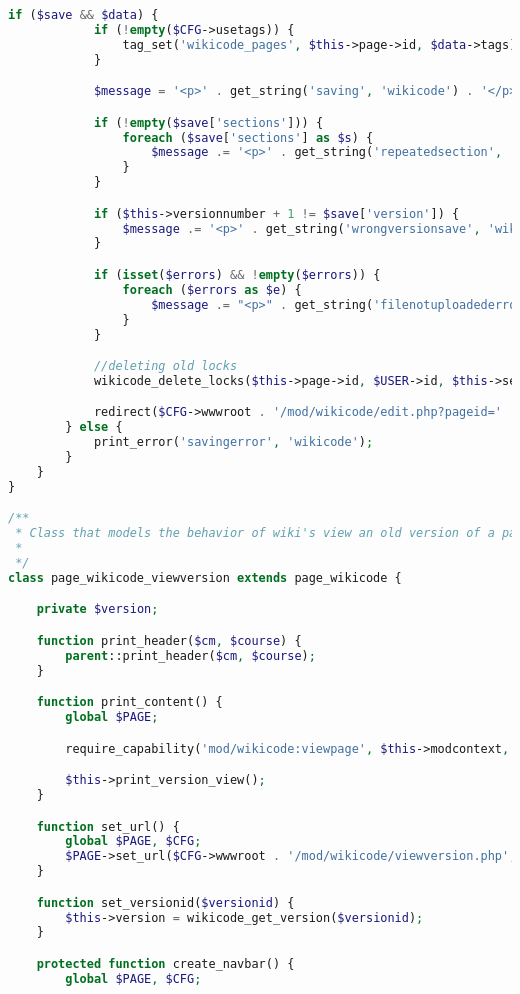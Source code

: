 \begin{lstlisting}[language=PHP]
        if ($save && $data) {
            if (!empty($CFG->usetags)) {
                tag_set('wikicode_pages', $this->page->id, $data->tags);
            }

            $message = '<p>' . get_string('saving', 'wikicode') . '</p>';

            if (!empty($save['sections'])) {
                foreach ($save['sections'] as $s) {
                    $message .= '<p>' . get_string('repeatedsection', 'wikicode', $s) . '</p>';
                }
            }

            if ($this->versionnumber + 1 != $save['version']) {
                $message .= '<p>' . get_string('wrongversionsave', 'wikicode') . '</p>';
            }

            if (isset($errors) && !empty($errors)) {
                foreach ($errors as $e) {
                    $message .= "<p>" . get_string('filenotuploadederror', 'wikicode', $e->get_filename()) . "</p>";
                }
            }

            //deleting old locks
            wikicode_delete_locks($this->page->id, $USER->id, $this->section);

            redirect($CFG->wwwroot . '/mod/wikicode/edit.php?pageid=' . $this->page->id);
        } else {
            print_error('savingerror', 'wikicode');
        }
    }
}

/**
 * Class that models the behavior of wiki's view an old version of a page
 *
 */
class page_wikicode_viewversion extends page_wikicode {

    private $version;

    function print_header($cm, $course) {
        parent::print_header($cm, $course);
    }

    function print_content() {
        global $PAGE;

        require_capability('mod/wikicode:viewpage', $this->modcontext, NULL, true, 'noviewpagepermission', 'wikicode');

        $this->print_version_view();
    }

    function set_url() {
        global $PAGE, $CFG;
        $PAGE->set_url($CFG->wwwroot . '/mod/wikicode/viewversion.php', array('pageid' => $this->page->id, 'versionid' => $this->version->id));
    }

    function set_versionid($versionid) {
        $this->version = wikicode_get_version($versionid);
    }

    protected function create_navbar() {
        global $PAGE, $CFG;


\end{lstlisting}
